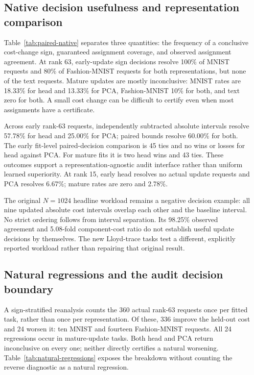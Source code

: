 \subsection{Native decision usefulness and representation comparison}
Table~\ref{tab:paired-native} separates three quantities: the frequency of a
conclusive cost-change sign, guaranteed assignment coverage, and observed
assignment agreement. At rank 63, early-update sign decisions resolve 100\% of
MNIST requests and 80\% of Fashion-MNIST requests for both representations,
but none of the text requests. Mature updates are mostly inconclusive:
MNIST rates are 18.33\% for head and 13.33\% for PCA, Fashion-MNIST 10\% for both,
and text zero for both. A small cost change can be difficult to certify even
when most assignments have a certificate.


Across early rank-63 requests, independently subtracted absolute intervals
resolve 57.78\% for head and 25.00\% for PCA; paired bounds resolve 60.00\% for
both. The early fit-level paired-decision comparison is 45 ties and no wins or
losses for head against PCA. For mature fits it is two head wins and 43 ties.
These outcomes support a representation-agnostic audit interface rather than
uniform learned superiority. At rank 15, early head resolves no actual update
requests and PCA resolves 6.67\%; mature rates are zero and 2.78\%.

The original $N=1024$ headline workload remains a negative decision example:
all nine updated absolute cost intervals overlap each other and the baseline
interval. No strict ordering follows from interval separation. Its 98.25\%
observed agreement and 5.08-fold component-cost ratio do not establish useful
update decisions by themselves. The new Lloyd-trace tasks test a different,
explicitly reported workload rather than repairing that original result.

\subsection{Natural regressions and the audit decision boundary}
A sign-stratified reanalysis counts the 360 actual rank-63 requests once per
fitted task, rather than once per representation. Of these, 336 improve the
held-out cost and 24 worsen it: ten MNIST and fourteen Fashion-MNIST requests.
All 24 regressions occur in mature-update tasks. Both head and PCA return
inconclusive on every one; neither directly certifies a natural worsening.
Table~\ref{tab:natural-regressions} exposes the breakdown without counting the
reverse diagnostic as a natural regression.


